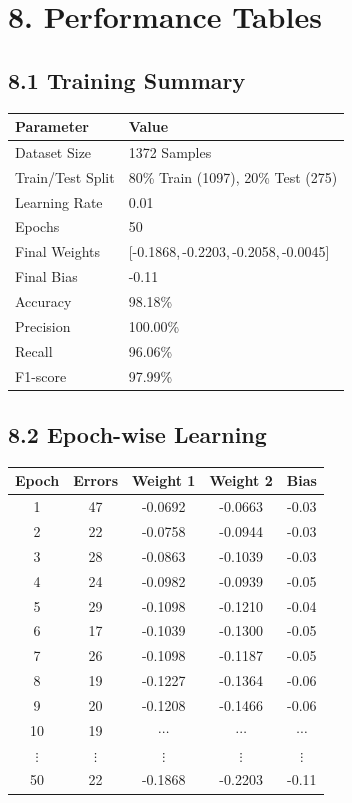 \documentclass{article}
\begin{document}
\clearpage

\section*{8. Performance Tables}

\subsection*{8.1 Training Summary}

\begin{center}
\begin{tabular}{|p{6cm}|p{7cm}|}
\hline
\textbf{Parameter} & \textbf{Value}\\
\hline
Dataset Size & 1372 Samples\\
\hline
Train/Test Split & 80\% Train (1097), 20\% Test (275)\\
\hline
Learning Rate & 0.01\\
\hline
Epochs & 50\\
\hline
Final Weights & [-0.1868,\,-0.2203,\,-0.2058,\,-0.0045]\\
\hline
Final Bias & -0.11\\
\hline
Accuracy & 98.18\%\\
\hline
Precision & 100.00\%\\
\hline
Recall & 96.06\%\\
\hline
F1-score & 97.99\%\\
\hline
\end{tabular}
\end{center}

\vspace{5mm}

\subsection*{8.2 Epoch-wise Learning}

\begin{center}
\begin{tabular}{|c|c|c|c|c|}
\hline
Epoch & Errors & Weight 1 & Weight 2 & Bias\\
\hline
1 & 47 & -0.0692 & -0.0663 & -0.03\\
\hline
2 & 22 & -0.0758 & -0.0944 & -0.03\\
\hline
3 & 28 & -0.0863 & -0.1039 & -0.03\\
\hline
4 & 24 & -0.0982 & -0.0939 & -0.05\\
\hline
5 & 29 & -0.1098 & -0.1210 & -0.04\\
\hline
6 & 17 & -0.1039 & -0.1300 & -0.05\\
\hline
7 & 26 & -0.1098 & -0.1187 & -0.05\\
\hline
8 & 19 & -0.1227 & -0.1364 & -0.06\\
\hline
9 & 20 & -0.1208 & -0.1466 & -0.06\\
\hline
10 & 19 & $\cdots$ & $\cdots$ & $\cdots$\\
\hline
$\vdots$ & $\vdots$ & $\vdots$ & $\vdots$ & $\vdots$\\
\hline
50 & 22 & -0.1868 & -0.2203 & -0.11\\
\hline
\end{tabular}
\end{center}
\clearpage
\end{document}
